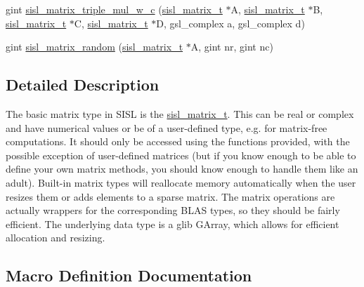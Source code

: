 \begin{DoxyCompactItemize}
\item 
gint \mbox{\hyperlink{group__matrix_ga4487a02844544e592ba0dc2931b07fc0}{sisl\+\_\+matrix\+\_\+triple\+\_\+mul\+\_\+w\+\_\+c}} (\mbox{\hyperlink{group__matrix_gad147923587b355644defb9bfbf981740}{sisl\+\_\+matrix\+\_\+t}} $\ast$A, \mbox{\hyperlink{group__matrix_gad147923587b355644defb9bfbf981740}{sisl\+\_\+matrix\+\_\+t}} $\ast$B, \mbox{\hyperlink{group__matrix_gad147923587b355644defb9bfbf981740}{sisl\+\_\+matrix\+\_\+t}} $\ast$C, \mbox{\hyperlink{group__matrix_gad147923587b355644defb9bfbf981740}{sisl\+\_\+matrix\+\_\+t}} $\ast$D, gsl\+\_\+complex a, gsl\+\_\+complex d)
\item 
gint \mbox{\hyperlink{group__matrix_ga19e36308f5f1faa18e4351aa8c8fc8ca}{sisl\+\_\+matrix\+\_\+random}} (\mbox{\hyperlink{group__matrix_gad147923587b355644defb9bfbf981740}{sisl\+\_\+matrix\+\_\+t}} $\ast$A, gint nr, gint nc)
\end{DoxyCompactItemize}


\subsection{Detailed Description}
The basic matrix type in S\+I\+SL is the \mbox{\hyperlink{group__matrix_gad147923587b355644defb9bfbf981740}{sisl\+\_\+matrix\+\_\+t}}. This can be real or complex and have numerical values or be of a user-\/defined type, e.\+g. for matrix-\/free computations. It should only be accessed using the functions provided, with the possible exception of user-\/defined matrices (but if you know enough to be able to define your own matrix methods, you should know enough to handle them like an adult). Built-\/in matrix types will reallocate memory automatically when the user resizes them or adds elements to a sparse matrix. The matrix operations are actually wrappers for the corresponding B\+L\+AS types, so they should be fairly efficient. The underlying data type is a glib G\+Array, which allows for efficient allocation and resizing. 

\subsection{Macro Definition Documentation}
\mbox{\label{group__matrix_ga352f97fb2d44b57e23e129d860458eeb}} 
